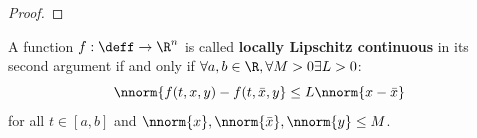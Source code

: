 \begin{lemma}
    \label{lemma-continuity}

\end{lemma}

\begin{proof}
\end{proof}

\begin{definition}
    \label{definition-lipschitz}

    A function $f:\deff\rightarrow\R^n$ is called \textbf{locally Lipschitz continuous} in its second argument if and only if $\forall a,b\in\R,\forall M>0 \exists L>0$:
    \begin{equation}
        \nnorm{f(t,x,y) - f(t,\bar{x},y} \leq L\nnorm{x - \bar{x}}
    \end{equation}
    for all $t\in [a,b]$ and $\nnorm{x},\nnorm{\bar{x}},\nnorm{y}\leq M$.
\end{definition}

